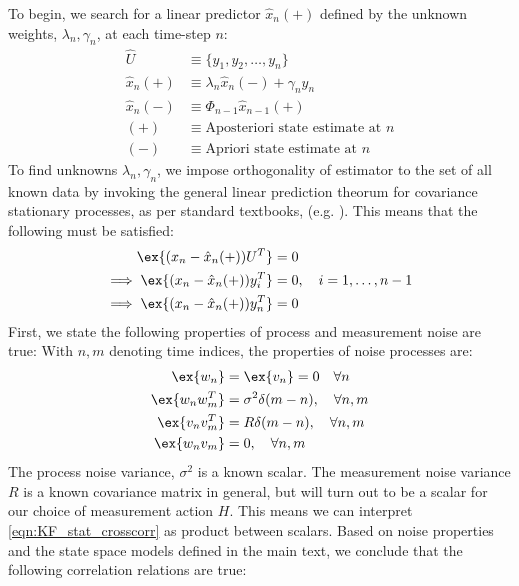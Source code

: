 To begin, we search for a linear predictor $\hat{x}_n(+)$ defined by the unknown weights, $\lambda_n, \gamma_n$, at each time-step $n$:
\begin{align}
\hat{U} & \equiv \{y_1, y_2,\dots, y_n\} \\
\hat{x}_n(+) & \equiv \lambda_n \hat{x}_n(-) + \gamma_n y_n \label{eqn:KF_predictor}\\
\hat{x}_n(-) & \equiv \Phi_{n-1} \hat{x}_{n-1}(+) \\
(+) &\equiv \text{Aposteriori state estimate at $n$}\\
(-) &\equiv \text{Apriori state estimate at $n$}
\end{align}
To find unknowns $\lambda_n, \gamma_n$, we impose orthogonality of estimator to the set of all known data by invoking the general linear prediction theorum for covariance stationary processes, as per standard textbooks, (e.g. \cite{grewal2001theory,karlin2012first}). This means that the following must be satisfied:
\begin{align}
\ex{(x_n - \hat{x}_n(+))U^T} &= 0 \label{eqn:KF_reln_1}\\
\implies \ex{(x_n - \hat{x}_n(+))y_i^T} &= 0, \quad i = 1,\dots, n-1 \label{eqn:KF_reln_2}\\
\implies \ex{(x_n - \hat{x}_n(+))y_n^T} &= 0 \label{eqn:KF_reln_3}
\end{align}
First, we state the following properties of process and measurement noise are true:
With $n,m$ denoting time indices, the properties of noise processes are:
\begin{align}
\ex{w_n} & = \ex{v_n}= 0 \quad \forall n \label{eqn:KF_stat_noisemean}\\
\ex{w_nw_m^T} &= \sigma^2 \delta(m-n),  \quad \forall n,m \label{eqn:KF_stat_noisepros}\\
\ex{v_n v_m^T}&= R\delta(m-n), \quad  \forall n,m  \label{eqn:KF_stat_noisemsmt} \\
\ex{w_n v_m} &= 0,  \quad \forall n,m \label{eqn:KF_stat_crosscorr}
\end{align} 
The process noise variance, $\sigma^2$ is a known scalar. The measurement noise variance $R$ is a known covariance matrix in general, but will turn out to be a scalar for our choice of measurement action $H$. This means we can interpret \ref{eqn:KF_stat_crosscorr} as product between scalars. Based on noise properties and the state space models defined in the main text, we conclude that the following correlation relations are true:
